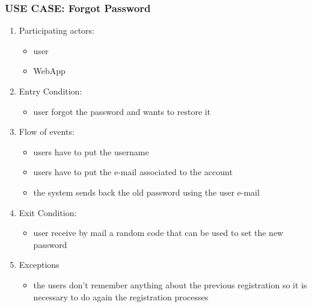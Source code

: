 \documentclass{article}
\begin{document}
\subsubsection{\textbf{USE CASE}: Forgot Password}
\begin{enumerate}
\item Participating actors: 
\begin{itemize}
    \item user
    \item WebApp
\end{itemize}
\item Entry Condition: 
\begin{itemize}
    \item user forgot the password and wants to restore it
\end{itemize}
\item Flow of events: 
\begin{itemize}
    \item users have to put the username 
    \item users have to put the e-mail associated to the account 
    \item the system sends back the old password using the user e-mail
\end{itemize}
\item Exit Condition: 
\begin{itemize}
    \item user receive by mail a random code that can be used to set the new password
\end{itemize}
\item Exceptions
\begin{itemize}
    \item the users don’t remember anything about the previous registration so it is necessary to do again the registration processes
\end{itemize}
\end{enumerate}
\end{document}
